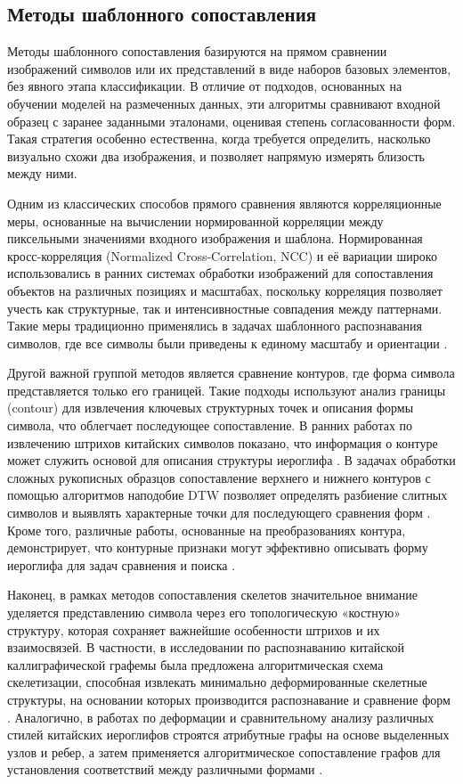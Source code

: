 \subsection{Методы шаблонного сопоставления}
Методы шаблонного сопоставления базируются на прямом сравнении изображений символов или их представлений в виде наборов базовых элементов, без явного этапа классификации. В отличие от подходов, основанных на обучении моделей на размеченных данных, эти алгоритмы сравнивают входной образец с заранее заданными эталонами, оценивая степень согласованности форм. Такая стратегия особенно естественна, когда требуется определить, насколько визуально схожи два изображения, и позволяет напрямую измерять близость между ними.

Одним из классических способов прямого сравнения являются корреляционные меры, основанные на вычислении нормированной корреляции между пиксельными значениями входного изображения и шаблона. Нормированная кросс-корреляция (Normalized Cross-Correlation, NCC) и её вариации широко использовались в ранних системах обработки изображений для сопоставления объектов на различных позициях и масштабах, поскольку корреляция позволяет учесть как структурные, так и интенсивностные совпадения между паттернами. Такие меры традиционно применялись в задачах шаблонного распознавания символов, где все символы были приведены к единому масштабу и ориентации \cite{8354319, lanjewar2021template}.

Другой важной группой методов является сравнение контуров, где форма символа представляется только его границей. Такие подходы используют анализ границы (contour) для извлечения ключевых структурных точек и описания формы символа, что облегчает последующее сопоставление. В ранних работах по извлечению штрихов китайских символов показано, что информация о контуре может служить основой для описания структуры иероглифа \cite{lee1998chinese}. В задачах обработки сложных рукописных образцов сопоставление верхнего и нижнего контуров с помощью алгоритмов наподобие DTW позволяет определять разбиение слитных символов и выявлять характерные точки для последующего сравнения форм \cite{xu2010touching}. Кроме того, различные работы, основанные на преобразованиях контура, демонстрирует, что контурные признаки могут эффективно описывать форму иероглифа для задач сравнения и поиска \cite{tao1999feature}.

Наконец, в рамках методов сопоставления скелетов значительное внимание уделяется представлению символа через его топологическую «костную» структуру, которая сохраняет важнейшие особенности штрихов и их взаимосвязей. В частности, в исследовании по распознаванию китайской каллиграфической графемы была предложена алгоритмическая схема скелетизации, способная извлекать минимально деформированные скелетные структуры, на основании которых производится распознавание и сравнение форм \cite{yu2008skeleton}. Аналогично, в работах по деформации и сравнительному анализу различных стилей китайских иероглифов строятся атрибутные графы на основе выделенных узлов и ребер, а затем применяется алгоритмическое сопоставление графов для установления соответствий между различными формами \cite{liu2015morphing}.

